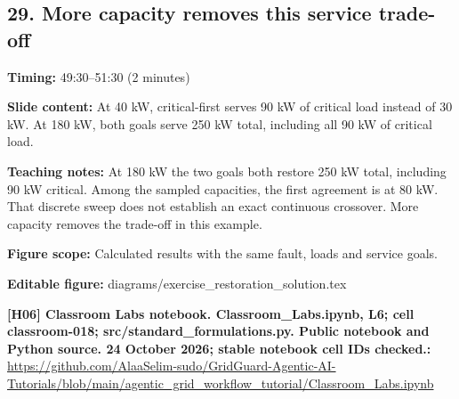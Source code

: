 \documentclass[10pt,letterpaper]{article}
\begin{document}
\subsection*{29. More capacity removes this service trade-off}
\textbf{Timing:} 49:30--51:30 (2 minutes)\par
\textbf{Slide content:} At 40 kW, critical-first serves 90 kW of critical load instead of 30 kW.
At 180 kW, both goals serve 250 kW total, including all 90 kW of critical load.\par
\textbf{Teaching notes:} At 180 kW the two goals both restore 250 kW total, including 90 kW critical. Among the sampled capacities, the first agreement is at 80 kW. That discrete sweep does not establish an exact continuous crossover. More capacity removes the trade-off in this example.\par
\textbf{Figure scope:} Calculated results with the same fault, loads and service goals.\par
\textbf{Editable figure:} diagrams/exercise\_restoration\_solution.tex\par
\textbf{[H06] Classroom Labs notebook. Classroom\_Labs.ipynb, L6; cell classroom-018; src/standard\_formulations.py. Public notebook and Python source. 24 October 2026; stable notebook cell IDs checked.:} \href{https://github.com/AlaaSelim-sudo/GridGuard-Agentic-AI-Tutorials/blob/main/agentic_grid_workflow_tutorial/Classroom_Labs.ipynb}{\small\ttfamily https:/\allowbreak{}/\allowbreak{}github.\allowbreak{}com/\allowbreak{}AlaaSelim-\allowbreak{}sudo/\allowbreak{}GridGuard-\allowbreak{}Agentic-\allowbreak{}AI-\allowbreak{}Tutorials/\allowbreak{}blob/\allowbreak{}main/\allowbreak{}agentic\_\allowbreak{}grid\_\allowbreak{}workflow\_\allowbreak{}tutorial/\allowbreak{}Classroom\_\allowbreak{}Labs.\allowbreak{}ipynb}\par
\par\medskip
\end{document}
